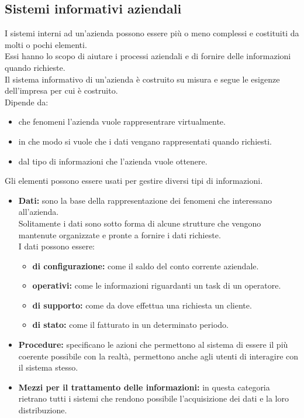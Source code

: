 \documentclass[../main.tex]{subfiles}
\begin{document}
	\subsection{Sistemi informativi aziendali}
	I sistemi interni ad un'azienda possono essere più o meno complessi e costituiti da molti o pochi elementi.\\
	Essi hanno lo scopo di aiutare i processi aziendali e di fornire delle informazioni quando richieste.\\
	Il sistema informativo di un'azienda è costruito su misura e segue le esigenze dell'impresa per cui è costruito.\\
	Dipende da:
	\begin{itemize}
		\item che fenomeni l'azienda vuole rappresentrare virtualmente.
		\item in che modo si vuole che i dati vengano rappresentati quando richiesti.
		\item dal tipo di informazioni che l'azienda vuole ottenere.
	\end{itemize}
	Gli elementi possono essere usati per gestire diversi tipi di informazioni.
	\begin{itemize}
		\item \textbf{Dati:} sono la base della rappresentazione dei fenomeni che interessano all'azienda.\\
			Solitamente i dati sono sotto forma di alcune strutture che vengono mantenute organizzate e pronte a fornire i dati richieste.\\
			I dati possono essere:
			\begin{itemize}
				\item \textbf{di configurazione:} come il saldo del conto corrente aziendale.
				\item \textbf{operativi:} come le informazioni riguardanti un task di un operatore.
				\item \textbf{di supporto:} come da dove effettua una richiesta un cliente.
				\item \textbf{di stato:} come il fatturato in un determinato periodo. 
			\end{itemize}
			\item \textbf{Procedure:} specificano le azioni che permettono al sistema di essere il più coerente possibile con la realtà, permettono anche agli utenti di interagire con il sistema stesso.
			\item \textbf{Mezzi per il trattamento delle informazioni:} in questa categoria rietrano tutti i sistemi che rendono possibile l'acquisizione dei dati e la loro distribuzione.
	\end{itemize}
\end{document}
